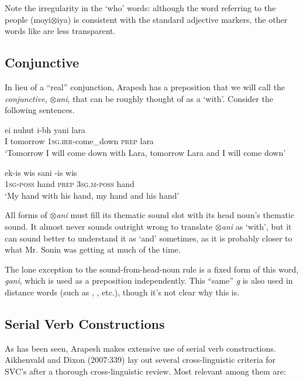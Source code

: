 \documentclass[pdftex,12pt,letterpaper]{article}
\let\ipa\textipa
\begin{document}
\noindent Note the irregularity in the `who' words: although the word referring to the people (moyi$\otimes$iya) is consistent with the standard adjective markers, the other words like \emph{\ipa{@n@kud@}} are less transparent. 

 \subsection{Conjunctive}

In lieu of a ``real'' conjunction, Arapesh has a preposition that we will call the \emph{conjunctive}, \emph{$\otimes$ani}, that can be roughly thought of as a `with'. Consider the following sentences.

\begin{exe}
\ex\gll ei nuhut i-b\ipa{@}h yani lara \\
I tomorrow \textsc{1sg.irr}-come\_down \textsc{prep} lara \\
\trans `Tomorrow I will come down with Lara, tomorrow Lara and I will come down'

\ex\gll ek-is wis sani \ipa{@n@n}-is wis \\
\textsc{1sg}-\textsc{poss} hand \textsc{prep} \textsc{3sg.m}-\textsc{poss} hand\\
\trans `My hand with his hand, my hand and his hand'
\end{exe}

\noindent All forms of \emph{$\otimes$ani} must fill its thematic sound slot with its head noun's thematic sound. It almost never sounds outright wrong to translate \emph{$\otimes$ani} as `with', but it can sound better to understand it as `and' sometimes, as it is probably closer to what Mr. Sonin was getting at much of the time.

The lone exception to the sound-from-head-noun rule is a fixed form of this word, \emph{gani}, which is used as a preposition independently. This ``same'' \emph{g} is also used in distance words (such as \ipa{@g1nd@k}, \ipa{gand@k}, etc.), though it's not clear why this is.
 
 \subsection{Serial Verb Constructions}

As has been seen, Arapesh makes extensive use of serial verb constructions. Aikhenvald and Dixon (2007:339) lay out several cross-linguistic criteria for SVC's after a thorough cross-linguistic review. Most relevant among them are:
\end{document}
